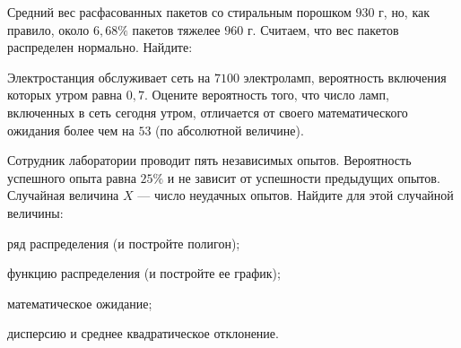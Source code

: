 \vfil

\begin{zkrPlain}{25}\noindent 
	Средний вес расфасованных пакетов со стиральным порошком $930$ г, но, как правило, около $6{,}68\%$ пакетов тяжелее $960$ г. Считаем, что вес пакетов распределен нормально. Найдите: \par {}
 
\end{zkrPlain}

\vfil

\begin{zkrPlain}{25}\noindent 
	Электростанция обслуживает сеть на $ 7100 $ электроламп, вероятность включения которых утром равна $ 0{,}7 $. Оцените вероятность того, что число ламп, включенных в сеть сегодня утром, отличается от своего математического ожидания более чем на $ 53 $ (по абсолютной величине). 
 
\end{zkrPlain}

\newpage\setcounter{zad}{0}\setcounter{footnote}{0}



\begin{zkrPlain}{25}\noindent 
	Сотрудник лаборатории проводит пять независимых опытов. Вероятность успешного опыта равна $25\%$ и не зависит от успешности предыдущих опытов. Случайная величина $X$ --- число неудачных опытов.  Найдите для этой случайной величины: \par \smallskip\small{ \par \zz ряд распределения (и постройте полигон); \par \zz функцию распределения (и постройте ее график); \par \zz математическое ожидание; \par \zz дисперсию и среднее квадратическое отклонение.\par \par}
 
\end{zkrPlain}

\vfil

